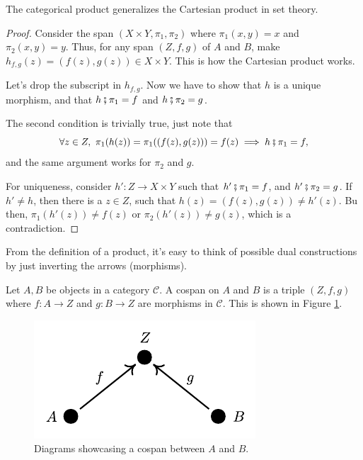 \begin{proposition}
  The categorical product generalizes the Cartesian product in set theory.
\end{proposition}
\begin{proof}
  Consider the span $(X\times Y, \pi_1,\pi_2)$ where $\pi_1(x,y) = x$ and $\pi_2(x,y) = y$.
  Thus, for any span $(Z, f, g)$ of $A$ and $B$, make $h_{f,g}(z) = (f(z), g(z)) \in X \times Y$.
  This is how the Cartesian product works.

  Let's drop the subscript in $h_{f,g}$.
  Now we have to show that $h$ is a unique morphism,
  and that $h \fatsemi \pi_1 = f$ and $h \fatsemi \pi_2 = g$.

  The second condition is trivially true, just note that
  \begin{displaymath}
    \forall z \in Z, \ \pi_1(h(z)) = \pi_1((f(z), g(z))) = f(z) \implies
    h \fatsemi \pi_1 = f,
  \end{displaymath}
  and the same argument works for $\pi_2$ and $g$.

  For uniqueness, consider $h':Z\to X\times Y$ such that
  $h' \fatsemi \pi_1 = f$, and $h' \fatsemi \pi_2 = g$.
  If $h' \neq h$, then there is a $z \in Z$,
  such that $h(z) = (f(z), g(z)) \neq h'(z)$. Bu then,
  $\pi_1(h'(z)) \neq f(z)$ or $\pi_2(h'(z)) \neq g(z)$, which
  is a contradiction.

\end{proof}

From the definition of a product, it's easy to think of possible dual constructions
by just inverting the arrows (morphisms).

\begin{definition}[Cospan]
  Let $A,B$ be objects in a  category $\mathcal C$. A cospan
  on $A$ and $B$ is a triple $(Z,f,g)$ where $f:A\to Z$ and
  $g:B\to Z$ are morphisms in $\mathcal C$. This is
  shown in Figure \ref{fig:Cospan}.
\end{definition}

\begin{figure}[H]
  \begin{center}
    \includegraphics{./notebooks/Cospan.pdf}
  \end{center}
  \caption{Diagrams showcasing a cospan between $A$ and $B$.}
  \label{fig:Cospan}
\end{figure}

